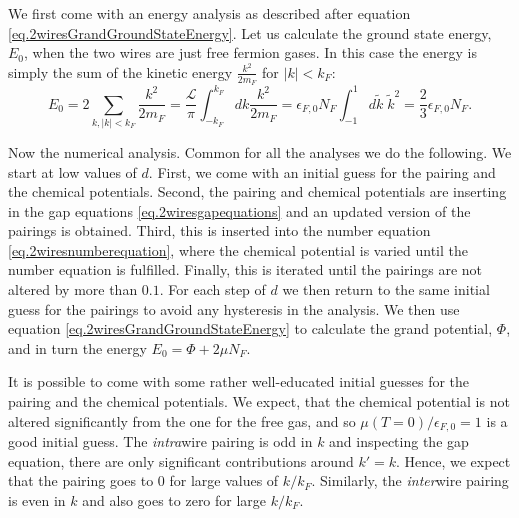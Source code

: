 We first come with an energy analysis as described after equation \eqref{eq.2wiresGrandGroundStateEnergy}. Let us calculate the ground state energy, $E_0$, when the two wires are just free fermion gases. In this case the energy is simply the sum of the kinetic energy $\frac{k^2}{2m_F}$ for $|k| < k_F$: 
\begin{equation}
E_0 = 2\sum_{k, |k| < k_F} \frac{k^2}{2m_F} = \frac{\mathcal{L}}{\pi} \int^{k_F}_{-k_F} dk \frac{k^2}{2m_F} = \epsilon_{F,0} N_F \int^{1}_{-1} d\tilde{k}\; \tilde{k}^2 = \frac{2}{3}\epsilon_{F,0} N_F. 
\end{equation}

Now the numerical analysis. Common for all the analyses we do the following. We start at low values of $d$. First, we come with an initial guess for the pairing and the chemical potentials. Second, the pairing and chemical potentials are inserting in the gap equations \ref{eq.2wiresgapequations} and an updated version of the pairings is obtained. Third, this is inserted into the number equation \ref{eq.2wiresnumberequation}, where the chemical potential is varied until the number equation is fulfilled. Finally, this is iterated until the pairings are not altered by more than $0.1$\textperthousand. For each step of $d$ we then return to the same initial guess for the pairings to avoid any hysteresis in the analysis. We then use equation \eqref{eq.2wiresGrandGroundStateEnergy} to calculate the grand potential, $\Phi$, and in turn the energy $E_0 = \Phi + 2\mu N_F$.  

It is possible to come with some rather well-educated initial guesses for the pairing and the chemical potentials. We expect, that the chemical potential is not altered significantly from the one for the free gas, and so $\mu(T = 0)/\epsilon_{F,0} = 1$ is a good initial guess. The \textit{intra}wire pairing is odd in $k$ and inspecting the gap equation, there are only significant contributions around $k' = k$. Hence, we expect that the pairing goes to 0 for large values of $k/k_F$. Similarly, the \textit{inter}wire pairing is even in $k$ and also goes to zero for large $k / k_F$. 

